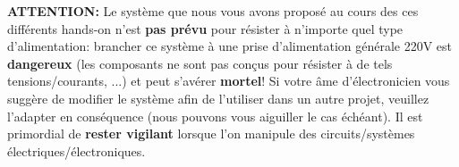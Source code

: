 \begin{tcolorbox}

\textbf{ATTENTION:} Le système que nous vous avons proposé au cours des ces différents hands-on n'est \textbf{pas prévu} pour résister à n'importe quel type d'alimentation: brancher ce système à une prise d'alimentation générale 220V est \textbf{dangereux} (les composants ne sont pas conçus pour résister à de tels tensions/courants, ...) et peut s'avérer \textbf{mortel}! Si votre âme d'électronicien vous suggère de modifier le système afin de l'utiliser dans un autre projet, veuillez l'adapter en conséquence (nous pouvons vous aiguiller le cas échéant). Il est primordial de \textbf{rester vigilant} lorsque l'on manipule des circuits/systèmes électriques/électroniques.

\end{tcolorbox}
